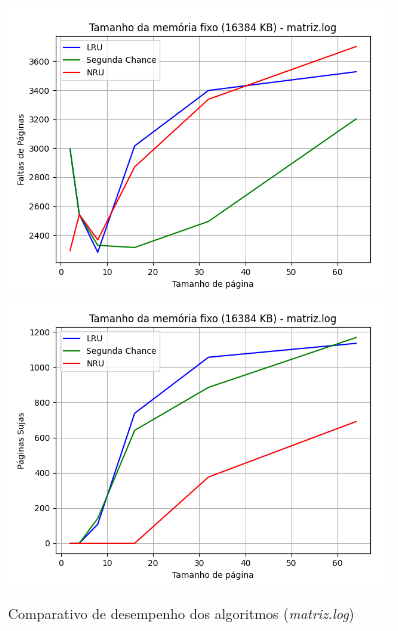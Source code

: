 \documentclass[a4paper, 12pt]{article}
\begin{document}
\begin{figure}[H]
    \centering
    \includegraphics[width=0.9\textwidth]{fixed_mem/matriz/fault.png}
    \hspace{1.5cm}
    \includegraphics[width=0.9\textwidth]{fixed_mem/matriz/write.png}
    \caption{Comparativo de desempenho dos algoritmos (\emph{matriz.log})}
    \label{fig:exampleFig1}
\end{figure}
\end{document}
